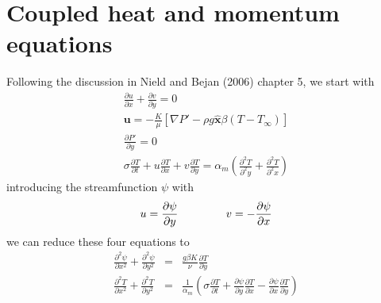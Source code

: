 \documentclass{article}
\begin{document}
\section{Coupled heat and momentum equations}
Following the discussion in Nield and Bejan (2006) chapter 5, we start with
\begin{eqnarray}
\frac{\partial u}{\partial x} + \frac{\partial v}{\partial y} = 0 \\
\mathbf{u} = - \frac{K}{\mu} \left[\nabla P' - \rho g \mathbf{\hat{x}} \beta (T-T_\infty) \right] \\
\frac{\partial P'}{\partial y} = 0 \\
\sigma \frac{\partial T}{\partial t} + u \frac{\partial T}{\partial x} + v \frac{\partial T}{\partial y} = \alpha_m \left( \frac{\partial^2 T}{\partial^2 y} + \frac{\partial^2 T}{\partial^2 x} \right)
\end{eqnarray}
introducing the streamfunction $\psi$ with
\begin{eqnarray}
u = \frac{\partial \psi}{\partial y} \hspace{10ex} v = - \frac{\partial \psi}{\partial x}
\end{eqnarray}
we can reduce these four equations to
\begin{eqnarray}
\frac{\partial^2 \psi}{\partial x^2} + \frac{\partial^2 \psi}{\partial y^2} &=& \frac{g \beta K}{\nu} \frac{\partial T}{\partial y} \\
\frac{\partial^2 T}{\partial x^2} + \frac{\partial^2 T}{\partial y^2} &=& \frac{1}{\alpha_m} \left( \sigma \frac{\partial T}{\partial t} + \frac{\partial \psi}{\partial y} \frac{\partial T}{\partial x} - \frac{\partial \psi}{\partial x} \frac{\partial T}{\partial y} \right)
\end{eqnarray}
\end{document}
